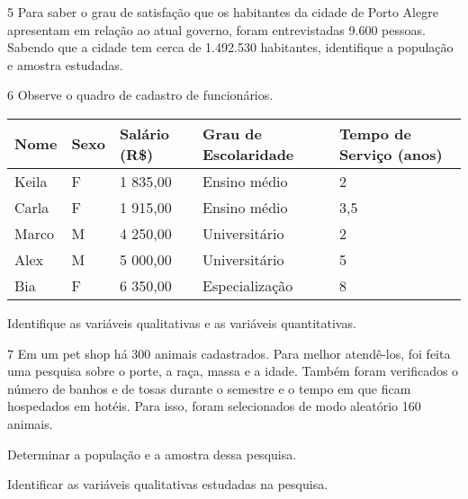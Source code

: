 {


\num{5} Para saber o grau de satisfação que os habitantes da cidade
de Porto Alegre apresentam em relação ao atual governo, foram
entrevistadas 9.600 pessoas. Sabendo que a cidade tem cerca de 1.492.530
habitantes, identifique a população e amostra estudadas.



\num{6} Observe o quadro de cadastro de
funcionários.

\begin{longtable}[]{@{}lllll@{}}
\toprule
\textbf{Nome} & \textbf{Sexo} & \textbf{Salário (R\$)} & \textbf{Grau de
Escolaridade} & \textbf{Tempo de Serviço (anos)}\tabularnewline
\midrule
\endhead
Keila & F & 1 835,00 & Ensino médio & 2\tabularnewline
Carla & F & 1 915,00 & Ensino médio & 3,5\tabularnewline
Marco & M & 4 250,00 & Universitário & 2\tabularnewline
Alex & M & 5 000,00 & Universitário & 5\tabularnewline
Bia & F & 6 350,00 & Especialização & 8\tabularnewline
\bottomrule
\end{longtable}

Identifique as variáveis qualitativas e as variáveis quantitativas.



\num{7} Em um pet shop há 300 animais cadastrados. Para melhor atendê-los,
foi feita uma pesquisa sobre o porte, a raça, massa e a idade. Também
foram verificados o número de banhos e de tosas durante o semestre e o
tempo em que ficam hospedados em hotéis. Para isso, foram selecionados
de modo aleatório 160 animais.

\begin{escolha}
\item
  Determinar a população e a amostra dessa pesquisa.


\item
  Identificar as variáveis qualitativas estudadas na pesquisa.



\end{escolha}}
